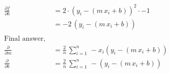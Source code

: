 \documentclass[11pt, a4paper]{article}
\begin{document}
\begin{align*}
    \frac{\partial f}{\partial b}              & = 2 \cdot (y_i - (m\,x_i + b))^2 \cdot -1                      \\
                                               & = -2\, (y_i - (m\,x_i + b))                                    \\ \\
    \text{Final answer, }                                                                                       \\
    \frac{\partial}{\partial m}                & = \frac{2}{n} \, \sum_{i = 1}^{n} \, -x_i (y_i - (m\,x_i + b)) \\
    \frac{\partial}{\partial b}                & = \frac{2}{n} \, \sum_{i = 1}^{n} \, -(y_i - (m\,x_i + b))
\end{align*}
\end{document}
